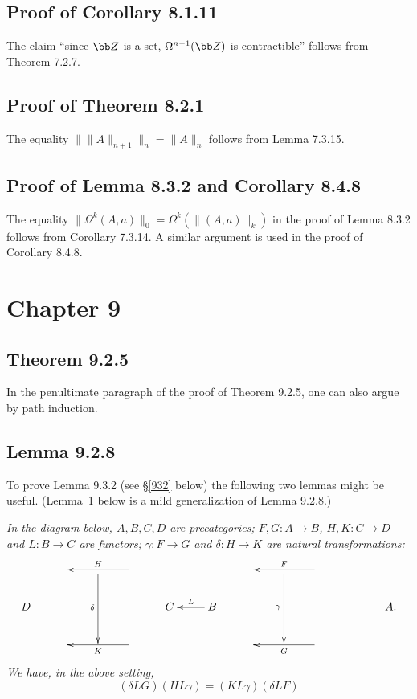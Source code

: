 \documentclass[12pt]{article}
\begin{document}
\subsection{Proof of Corollary 8.1.11}

The claim ``since $\bb Z$ is a set, $\Omega^{n-1}(\bb Z)$ is contractible'' follows from Theorem 7.2.7.%


\subsection{Proof of Theorem 8.2.1}

The equality $\lVert\lVert A\rVert_{n+1}\rVert_n=\lVert A\rVert_n$ follows from Lemma 7.3.15.


\subsection{Proof of Lemma 8.3.2 and Corollary 8.4.8}

The equality $\lVert\Omega^k(A,a)\rVert_0=\Omega^k(\lVert(A,a)\rVert_k)$ in the proof of Lemma 8.3.2 follows from Corollary 7.3.14. A similar argument is used in the proof of Corollary 8.4.8.


\section{Chapter 9}

\subsection{Theorem 9.2.5}

In the penultimate paragraph of the proof of Theorem 9.2.5, one can also argue by path induction.


\subsection{Lemma 9.2.8}\label{928}

To prove Lemma 9.3.2 (see \S\ref{932} below) the following two lemmas might be useful. (Lemma~1 below is a mild generalization of Lemma 9.2.8.)

\nn{} \emph{In the diagram below, $A,B,C,D$ are precategories; $F,G:A\to B$, $H,K:C\to D$ and $L:B\to C$ are functors; $\gamma:F\to G$ and $\delta:H\to K$ are natural transformations:
$$
\xymatrix{
&&\ar[dd]_\delta&\ar[ll]_H&&&&\ar[dd]_\gamma&\ar[ll]_F\\
D&&&&C&B\ar[l]_L&&&&&A.\\
&&&\ar[ll]^K&&&&&\ar[ll]^G}
$$ 
We have, in the above setting,}
\begin{equation}\label{9281}
(\delta LG)(HL\gamma)=(KL\gamma)(\delta LF)
\end{equation}
\end{document}
